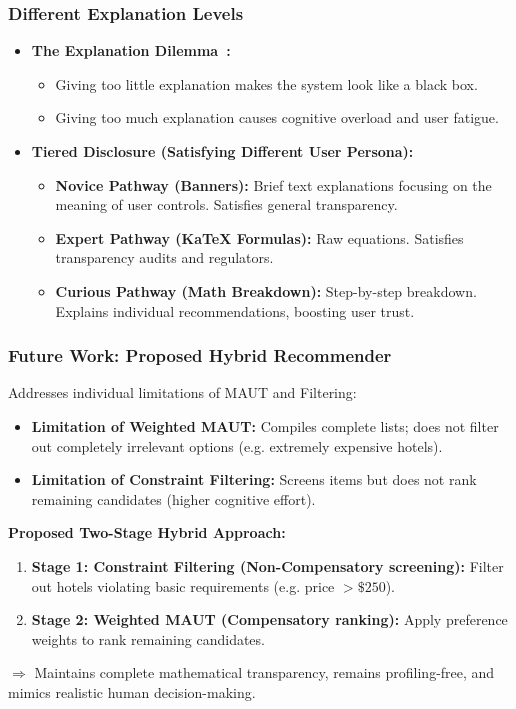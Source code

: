 \begin{frame}
    \frametitle{Different Explanation Levels}
    \begin{itemize}
        \item \textbf{The Explanation Dilemma~\cite{tintarev2012evaluating}:}
            \begin{itemize}
                \item Giving too little explanation makes the system look like a black box.
                \item Giving too much explanation causes cognitive overload and user fatigue.
            \end{itemize}
        \item \textbf{Tiered Disclosure (Satisfying Different User Persona):}
            \begin{itemize}
                \item \textbf{Novice Pathway (Banners):} Brief text explanations focusing on the meaning of user controls. Satisfies general transparency.
                \item \textbf{Expert Pathway (KaTeX Formulas):} Raw equations. Satisfies transparency audits and regulators.
                \item \textbf{Curious Pathway (Math Breakdown):} Step-by-step breakdown. Explains individual recommendations, boosting user trust.
            \end{itemize}
    \end{itemize}
\end{frame}
\begin{frame}
    \frametitle{Future Work: Proposed Hybrid Recommender}
    Addresses individual limitations of MAUT and Filtering:
    \begin{itemize}
        \item \textbf{Limitation of Weighted MAUT:} Compiles complete lists; does not filter out completely irrelevant options (e.g. extremely expensive hotels).
        \item \textbf{Limitation of Constraint Filtering:} Screens items but does not rank remaining candidates (higher cognitive effort).
    \end{itemize}
    \vspace{0.5em}
    \textbf{Proposed Two-Stage Hybrid Approach:}
    \begin{enumerate}
        \item \textbf{Stage 1: Constraint Filtering (Non-Compensatory screening):} Filter out hotels violating basic requirements (e.g. price $> \$250$).
        \item \textbf{Stage 2: Weighted MAUT (Compensatory ranking):} Apply preference weights to rank remaining candidates.
    \end{enumerate}
    \vspace{0.5em}
    $\Rightarrow$ Maintains complete mathematical transparency, remains profiling-free, and mimics realistic human decision-making.
\end{frame}


